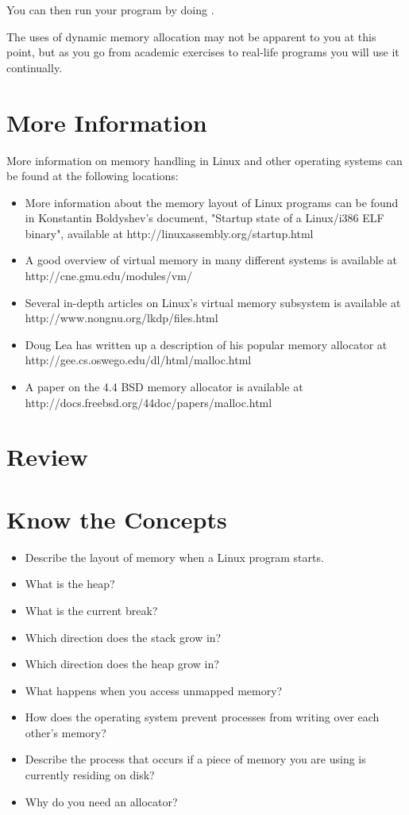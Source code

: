 You can then run your program by doing .

The uses of dynamic memory allocation may not be apparent to you at this point, but as
you go from academic exercises to real-life programs you will use it continually.

\section{More Information}

More information on memory handling in Linux and other operating systems can be
found at the following locations:

\begin{itemize}\item More information about the memory layout of Linux programs can be found in Konstantin Boldyshev's document, "Startup state of a Linux/i386 ELF binary", available at http://linuxassembly.org/startup.html 
\item A good overview of virtual memory in many different systems is available at http://cne.gmu.edu/modules/vm/ 
\item Several in-depth articles on Linux's virtual memory subsystem is available at http://www.nongnu.org/lkdp/files.html 
\item Doug Lea has written up a description of his popular memory allocator at http://gee.cs.oswego.edu/dl/html/malloc.html 
\item A paper on the 4.4 BSD memory allocator is available at http://docs.freebsd.org/44doc/papers/malloc.html 
\end{itemize}

\section{Review}

\section{Know the Concepts}

\begin{itemize}\item Describe the layout of memory when a Linux program starts. 
\item What is the heap? 
\item What is the current break? 
\item Which direction does the stack grow in? 
\item Which direction does the heap grow in? 
\item What happens when you access unmapped memory? 
\item How does the operating system prevent processes from writing over each other's memory? 
\item Describe the process that occurs if a piece of memory you are using is currently residing on disk? 
\item Why do you need an allocator? 
\end{itemize}

